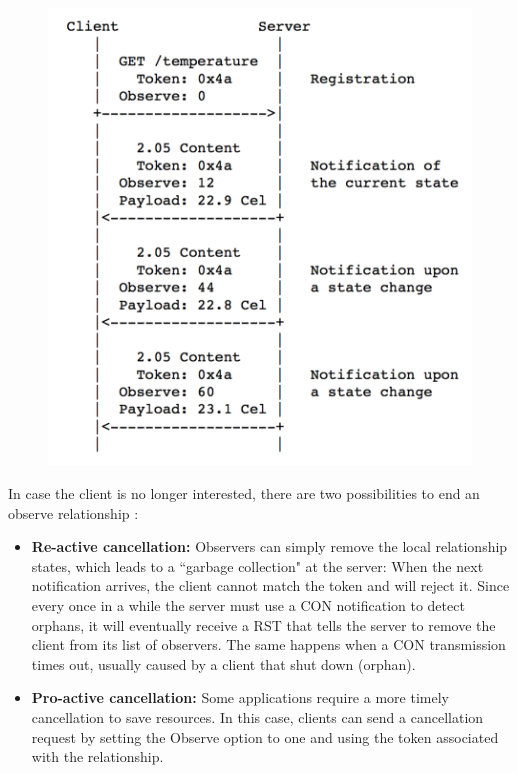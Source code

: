 \begin{figure}[!htbp]
\centering
\includegraphics[scale = 0.55]{coap_observe.png}
\label{fig:coap_observe}
\end{figure}

In case the client is no longer interested, there are two possibilities to end an observe relationship \cite{kovatsch2015scalable}:

\begin{itemize}

\item \textbf{Re-active cancellation:} Observers can simply remove the local relationship states, which leads to a ``garbage collection" at the server: When the next notification arrives, the client cannot match the token and will reject it. Since every once in a while the server must use a CON notification to detect orphans, it will eventually receive a RST that tells the server to remove the client from its list of observers. The same happens when a CON transmission times out, usually caused by a client that shut down (orphan).

\item \textbf{Pro-active cancellation:} Some applications require a more timely cancellation to save resources. In this case, clients can send a cancellation request by setting the Observe option to one and using the token associated with the relationship.

\end{itemize}

